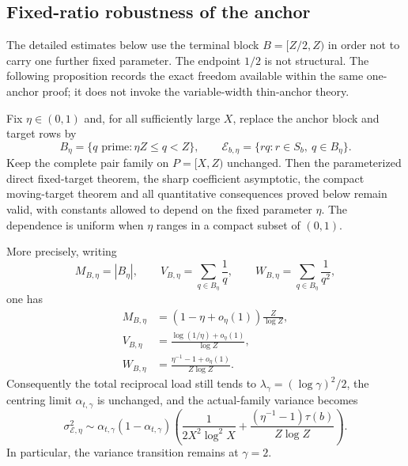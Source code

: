 \subsection{Fixed-ratio robustness of the anchor}
\label{sec:fixed-ratio-anchor}

The detailed estimates below use the terminal block $B=[Z/2,Z)$ in order not to carry one further fixed parameter.  The endpoint $1/2$ is not structural.  The following proposition records the exact freedom available within the same one-anchor proof; it does not invoke the variable-width thin-anchor theory.

\begin{proposition}
\label{prop:fixed-ratio-anchor}
Fix $\eta\in(0,1)$ and, for all sufficiently large $X$, replace the anchor block and target rows by
\[
 B_\eta=\{q\text{ prime}:\eta Z\leq q<Z\},
 \qquad
 \mathcal E_{b,\eta}=\{rq:r\in S_b,\ q\in B_\eta\}.
\]
Keep the complete pair family on $P=[X,Z)$ unchanged.  Then the parameterized direct fixed-target theorem, the sharp coefficient asymptotic, the compact moving-target theorem and all quantitative consequences proved below remain valid, with constants allowed to depend on the fixed parameter $\eta$.  The dependence is uniform when $\eta$ ranges in a compact subset of $(0,1)$.

More precisely, writing
\[
 M_{B,\eta}=|B_\eta|,
 \qquad
 V_{B,\eta}=\sum_{q\in B_\eta}\frac1q,
 \qquad
 W_{B,\eta}=\sum_{q\in B_\eta}\frac1{q^2},
\]
one has
\begin{align}
 M_{B,\eta}
  &=(1-\eta+o_\eta(1))\frac{Z}{\log Z},
 \label{eq:fixed-ratio-count}\\
 V_{B,\eta}
  &=\frac{\log(1/\eta)+o_\eta(1)}{\log Z},
 \label{eq:fixed-ratio-reciprocal}\\
 W_{B,\eta}
  &=\frac{\eta^{-1}-1+o_\eta(1)}{Z\log Z}.
 \label{eq:fixed-ratio-square}
\end{align}
Consequently the total reciprocal load still tends to $\lambda_\gamma=(\log\gamma)^2/2$, the centring limit $\alpha_{t,\gamma}$ is unchanged, and the actual-family variance becomes
\begin{equation}
\label{eq:fixed-ratio-variance}
 \sigma_{\mathcal E,\eta}^2
 \sim\alpha_{t,\gamma}(1-\alpha_{t,\gamma})
 \left(
  \frac1{2X^2\log^2X}
  +\frac{(\eta^{-1}-1)\tau(b)}{Z\log Z}
 \right).
\end{equation}
In particular, the variance transition remains at $\gamma=2$.
\end{proposition}

